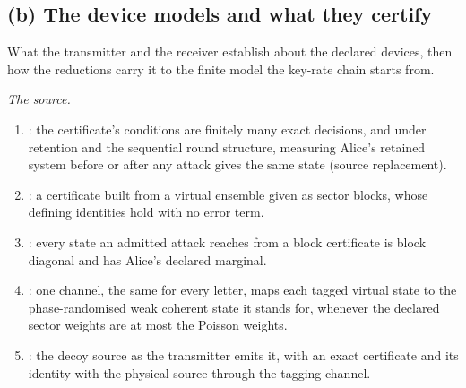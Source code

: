 \subsection*{(b) The device models and what they certify}

What the transmitter and the receiver establish about the declared devices,
then how the reductions carry it to the finite model the key-rate chain
starts from.

\smallskip\noindent\emph{The source.}
\begin{enumerate}[itemsep=1pt]
\item {}: the certificate's
  conditions are finitely many exact decisions, and under retention and the
  sequential round structure, measuring Alice's retained system before or
  after any attack gives the same state (source replacement).
\item {}: a certificate built from
  a virtual ensemble given as sector blocks, whose defining identities hold
  with no error term.
\item {}: every state an admitted attack
  reaches from a block certificate is block diagonal and has Alice's declared
  marginal.
\item {}: one channel, the same for every
  letter, maps each tagged virtual state to the phase-randomised weak coherent
  state it stands for, whenever the declared sector weights are at most the
  Poisson weights.
\item {}: the decoy source as the
  transmitter emits it, with an exact certificate and its identity with the
  physical source through the tagging channel.
\end{enumerate}

